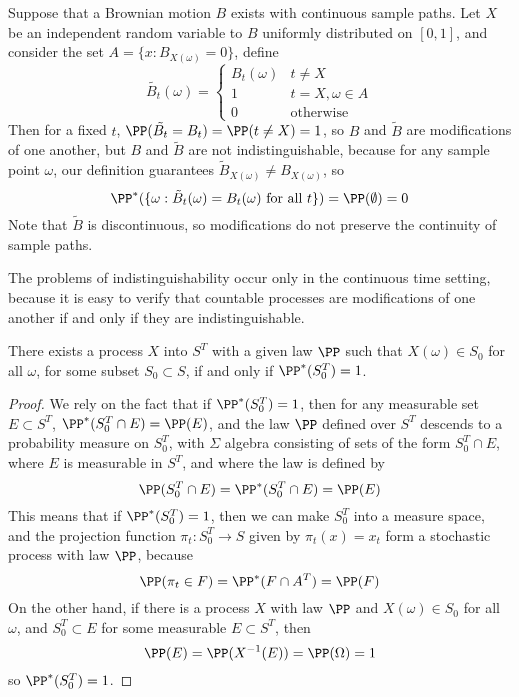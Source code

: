 \begin{example}
    Suppose that a Brownian motion $B$ exists with continuous sample paths. Let $X$ be an independent random variable to $B$ uniformly distributed on $[0,1]$, and consider the set $A = \{ x : B_{X(\omega)} = 0 \}$, define
    \[ \tilde{B_t}(\omega) = \begin{cases} B_t(\omega) & t \neq X \\ 1 & t = X, \omega \in A \\ 0 & \text{otherwise} \end{cases} \]
    Then for a fixed $t$, $\PP(\tilde{B_t} = B_t) = \PP(t \neq X) = 1$, so $B$ and $\tilde{B}$ are modifications of one another, but $B$ and $\tilde{B}$ are not indistinguishable, because for any sample point $\omega$, our definition guarantees $\tilde{B}_{X(\omega)} \neq B_{X(\omega)}$, so
    \[ \PP^*(\{ \omega: \tilde{B}_t(\omega) = B_t(\omega)\ \text{for all $t$} \}) = \PP(\emptyset) = 0 \]
    Note that $\tilde{B}$ is discontinuous, so modifications do not preserve the continuity of sample paths.
\end{example}

The problems of indistinguishability occur only in the continuous time setting, because it is easy to verify that countable processes are modifications of one another if and only if they are indistinguishable.

\begin{lemma}
    There exists a process $X$ into $S^T$ with a given law $\PP$ such that $X(\omega) \in S_0$ for all $\omega$, for some subset $S_0 \subset S$, if and only if $\PP^*(S_0^T) = 1$.
\end{lemma}
\begin{proof}
    We rely on the fact that if $\PP^*(S_0^T) = 1$, then for any measurable set $E \subset S^T$, $\PP^*(S_0^T \cap E) = \PP(E)$, and the law $\PP$ defined over $S^T$ descends to a probability measure on $S_0^T$, with $\Sigma$ algebra consisting of sets of the form $S_0^T \cap E$, where $E$ is measurable in $S^T$, and where the law is defined by
    \[ \PP(S_0^T \cap E) = \PP^*(S_0^T \cap E) = \PP(E) \]
    This means that if $\PP^*(S_0^T) = 1$, then we can make $S_0^T$ into a measure space, and the projection function $\pi_t: S_0^T \to S$ given by $\pi_t(x) = x_t$ form a stochastic process with law $\PP$, because
    \[ \PP(\pi_t \in F) = \PP^*(F \cap A^T) = \PP(F) \]
    On the other hand, if there is a process $X$ with law $\PP$ and $X(\omega) \in S_0$ for all $\omega$, and $S_0^T \subset E$ for some measurable $E \subset S^T$, then
    \[ \PP(E) = \PP(X^{-1}(E)) = \PP(\Omega) = 1 \]
    so $\PP^*(S_0^T) = 1$.
\end{proof}

